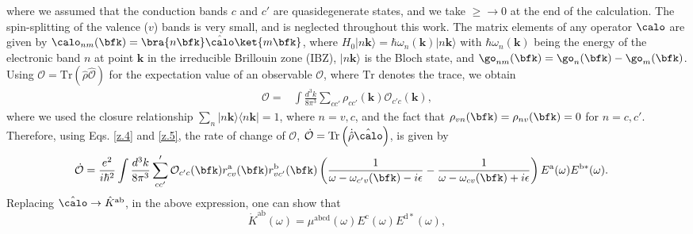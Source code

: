 \documentclass[floatfix,prb,aps,superscriptaddress,showpacs,11pt,preprint,letterpaper]{revtex4}
\begin{document}
where we assumed that the conduction bands $c$ and $c'$
are quasidegenerate  states, and we take $\ge\to 0$ at the end of the
calculation.  The spin-splitting of the valence ($v$) bands is very
small, and is neglected throughout this work.\cite{nastosPRB07}
The matrix elements of any operator $\calo$ are given by
$\calo_{nm}(\bfk)=\bra{n\bfk}\hat\calo\ket{m\bfk}$,
where 
$H_{0}|n\mathbf{k}\rangle = \hbar \omega_{n}(\mathbf{k})|n\mathbf{k}\rangle$ 
with $\hbar \omega_{n}(\mathbf{k})$ being the energy of the
electronic band $n$ at point $\mathbf{k}$ in the irreducible Brillouin zone
(IBZ),  $|n\mathbf{k}\rangle$ is the Bloch state, and 
$\go_{nm}(\bfk)=\go_{n}(\bfk)-\go_{m}(\bfk)$.
Using 
$\mathcal{O} = \mathrm{Tr}(\hat{\rho}\hat{\mathcal{O}})$
for the expectation value of an observable $\mathcal{O}$, 
where $\mathrm{Tr}$ denotes the trace, we obtain
\begin{align}\label{z.5}
\mathcal{O} 
=& 
\int \frac{d^{3}k}{8\pi^{3}} \sum_{cc'} \rho_{cc'}(\mathbf{k}) 
\mathcal{O}_{c'c}(\mathbf{k}),
\end{align}
where we used 
the closure
relationship $\sum_{n}|n\mathbf{k}\rangle \langle n\mathbf{k}| = 1$,
where $n=v,c$,
and the fact that $\rho_{vn}(\bfk)=\rho_{nv}(\bfk)=0$ for $n=c,c'$. 
Therefore, 
using  Eqs. \eqref{z.4} and \eqref{z.5},
the
rate of change of $\mathcal{O}$,
$\dot{\mathcal{O}} 
=
\mathrm{Tr} \left( \dot{\hat\rho} \hat\calo \right)
$,
 is given by
\begin{align}
\dot{\mathcal{O}} 
&=\frac{e^{2}}{i\hbar^{2}} \int \frac{d^{3}k}{8\pi^{3}} 
\sum'_{cc'} \mathcal{O}_{c'c}(\bfk) 
r^{\mathrm{a}}_{cv}(\bfk)  r^{\mathrm{b}}_{vc'}(\bfk)  
\left( \frac{1}{\omega - \omega_{c'v}(\bfk)  - i\epsilon} - 
\frac{1}{\omega - \omega_{cv}(\bfk)  + i\epsilon} \right)
E^{\mathrm{a}}(\omega) E^{\mathrm{b*}}(\omega)
\label{eq:dotO}
.
\end{align}
Replacing  $\hat\calo \rightarrow \hat{K}^{\mathrm{ab}}$, in 
the above expression, one can show that
\begin{equation}
\dot{K}^{\mathrm{ab}}(\omega) =
\mu^{\mathrm{abcd}}(\omega)
E^{\mathrm{c}}(\omega) E^{\mathrm{d*}}(\omega),
\label{eq:dotk}
\end{equation}
\end{document}
